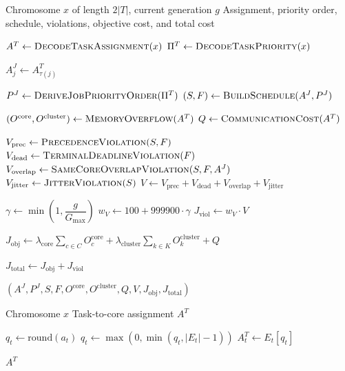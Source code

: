 \documentclass{article}
\begin{document}
\begin{algorithm}[H]
    \caption{Decode Chromosome}
    \label{alg:decode_chromosome}
    \begin{algorithmic}[1]
        \Require Chromosome $x$ of length $2|T|$, current generation $g$
        \Ensure Assignment, priority order, schedule, violations, objective cost, and total cost

        \State $A^T \gets \Call{DecodeTaskAssignment}{x}$
        \State $\Pi^T \gets \Call{DecodeTaskPriority}{x}$

        \Statex
            \State $A^J_j \gets A^T_{\tau(j)}$
        \EndFor

        \State $P^J \gets \Call{DeriveJobPriorityOrder}{\Pi^T}$
        \State $(S,F) \gets \Call{BuildSchedule}{A^J,P^J}$

        \Statex
        \State $(O^{\mathrm{core}},O^{\mathrm{cluster}}) \gets \Call{MemoryOverflow}{A^T}$
        \State $Q \gets \Call{CommunicationCost}{A^T}$

        \Statex
        \State $V_{\mathrm{prec}} \gets \Call{PrecedenceViolation}{S,F}$
        \State $V_{\mathrm{dead}} \gets \Call{TerminalDeadlineViolation}{F}$
        \State $V_{\mathrm{overlap}} \gets \Call{SameCoreOverlapViolation}{S,F,A^J}$
        \State $V_{\mathrm{jitter}} \gets \Call{JitterViolation}{S}$
        \State $V \gets V_{\mathrm{prec}} + V_{\mathrm{dead}} + V_{\mathrm{overlap}} + V_{\mathrm{jitter}}$

        \Statex
        \State $\gamma \gets \min\left(1,\dfrac{g}{G_{\max}}\right)$
        \State $w_V \gets 100 + 999900 \cdot \gamma$
        \State $J_{\mathrm{viol}} \gets w_V \cdot V$

        \Statex
        \State $J_{\mathrm{obj}} \gets
        \lambda_{\mathrm{core}} \sum_{c \in C} O^{\mathrm{core}}_c
        + \lambda_{\mathrm{cluster}} \sum_{k \in K} O^{\mathrm{cluster}}_k
        + Q$

        \State $J_{\mathrm{total}} \gets J_{\mathrm{obj}} + J_{\mathrm{viol}}$

        \State \Return $(A^J,P^J,S,F,O^{\mathrm{core}},O^{\mathrm{cluster}},Q,V,J_{\mathrm{obj}},J_{\mathrm{total}})$
    \end{algorithmic}
\end{algorithm}

\begin{algorithm}[H]
    \caption{Decode Task Assignment}
    \label{alg:decode_task_assignment}
    \begin{algorithmic}[1]
        \Require Chromosome $x$
        \Ensure Task-to-core assignment $A^T$

            \State $q_t \gets \mathrm{round}(a_t)$
            \State $q_t \gets \max(0,\min(q_t,|E_t|-1))$
            \State $A^T_t \gets E_t[q_t]$
        \EndFor

        \State \Return $A^T$
    \end{algorithmic}
\end{algorithm}
\end{document}
